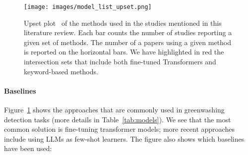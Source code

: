 \begin{figure}
    \centering
    \texttt{[image: images/model\_list\_upset.png]}
    \caption{Upset plot~\cite{upset_plot} of the methods used in the studies mentioned in this literature review. Each bar counts the number of studies reporting a given set of methods. The number of a papers using a given method is reported on the horizontal bars. We have highlighted in red the intersection sets that include both fine-tuned Transformers and keyword-based methods.}
    \label{fig:models}
\end{figure}

\paragraph{Baselines} Figure~\ref{fig:models} shows the approaches that are commonly used in greenwashing detection tasks (more details in Table~\ref{tab:models}). We see that the most common solution is fine-tuning transformer models; more recent approaches include using LLMs as few-shot learners. The figure also shows which baselines have been used:
